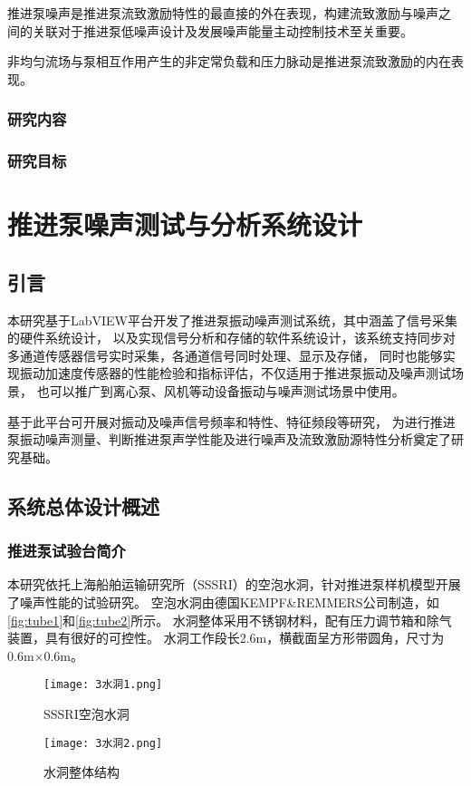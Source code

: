 推进泵噪声是推进泵流致激励特性的最直接的外在表现，构建流致激励与噪声之
间的关联对于推进泵低噪声设计及发展噪声能量主动控制技术至关重要。

非均匀流场与泵相互作用产生的非定常负载和压力脉动是推进泵流致激励的内在表现。


\subsection{研究内容}
\subsection{研究目标}

\chapter{推进泵噪声测试与分析系统设计}
\section{引言}
本研究基于LabVIEW平台开发了推进泵振动噪声测试系统，其中涵盖了信号采集的硬件系统设计，
以及实现信号分析和存储的软件系统设计，该系统支持同步对多通道传感器信号实时采集，各通道信号同时处理、显示及存储，
同时也能够实现振动加速度传感器的性能检验和指标评估，不仅适用于推进泵振动及噪声测试场景，
也可以推广到离心泵、风机等动设备振动与噪声测试场景中使用。

基于此平台可开展对振动及噪声信号频率和特性、特征频段等研究，
为进行推进泵振动噪声测量、判断推进泵声学性能及进行噪声及流致激励源特性分析奠定了研究基础。

\section{系统总体设计概述}
\subsection{推进泵试验台简介}
本研究依托上海船舶运输研究所（SSSRI）的空泡水洞，针对推进泵样机模型开展了噪声性能的试验研究。
空泡水洞由德国KEMPF\&REMMERS公司制造，如\autoref{fig:tube1}和\autoref{fig:tube2}所示。
水洞整体采用不锈钢材料，配有压力调节箱和除气装置，具有很好的可控性。
水洞工作段长2.6m，横截面呈方形带圆角，尺寸为0.6m×0.6m。
\begin{figure}[htbp]
    \centering
    \texttt{[image: 3水洞1.png]}
    \caption{\label{fig:tube1}SSSRI空泡水洞}
\end{figure}
\begin{figure}[htbp]
    \centering
    \texttt{[image: 3水洞2.png]}
    \caption{\label{fig:tube2}水洞整体结构}
\end{figure}

